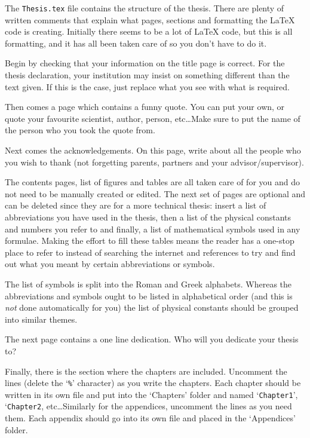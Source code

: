 The \texttt{Thesis.tex} file contains the structure of the thesis. There are plenty of written comments that explain what pages, sections and formatting the \LaTeX{} code is creating. Initially there seems to be a lot of \LaTeX{} code, but this is all formatting, and it has all been taken care of so you don't have to do it.

Begin by checking that your information on the title page is correct. For the thesis declaration, your institution may insist on something different than the text given. If this is the case, just replace what you see with what is required.

Then comes a page which contains a funny quote. You can put your own, or quote your favourite scientist, author, person, etc\ldots Make sure to put the name of the person who you took the quote from.

Next comes the acknowledgements. On this page, write about all the people who you wish to thank (not forgetting parents, partners and your advisor/supervisor).

The contents pages, list of figures and tables are all taken care of for you and do not need to be manually created or edited. The next set of pages are optional and can be deleted since they are for a more technical thesis: insert a list of abbreviations you have used in the thesis, then a list of the physical constants and numbers you refer to and finally, a list of mathematical symbols used in any formulae. Making the effort to fill these tables means the reader has a one-stop place to refer to instead of searching the internet and references to try and find out what you meant by certain abbreviations or symbols.

The list of symbols is split into the Roman and Greek alphabets. Whereas the abbreviations and symbols ought to be listed in alphabetical order (and this is \emph{not} done automatically for you) the list of physical constants should be grouped into similar themes.

The next page contains a one line dedication. Who will you dedicate your thesis to?

Finally, there is the section where the chapters are included. Uncomment the lines (delete the `\texttt{\%}' character) as you write the chapters. Each chapter should be written in its own file and put into the `Chapters' folder and named `\texttt{Chapter1}', `\texttt{Chapter2}, etc\ldots Similarly for the appendices, uncomment the lines as you need them. Each appendix should go into its own file and placed in the `Appendices' folder.

